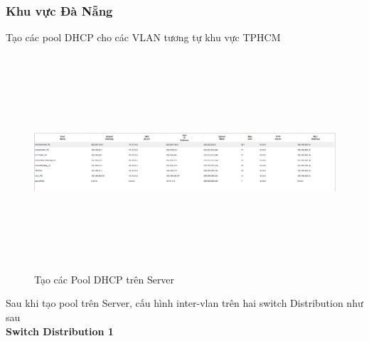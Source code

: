 \documentclass[12pt,a4paper]{report}
\begin{document}
\subsubsection{Khu vực Đà Nẵng}
\hspace*{0.25cm}Tạo các pool DHCP cho các VLAN tương tự khu vực TPHCM\\
\begin{figure}[H]
    \centering
    \includegraphics[width=16cm, height=8cm]{img/472.png}
    \caption{Tạo các Pool DHCP trên Server}
    \label{hinh472}
\end{figure}
\hspace*{0.25cm}Sau khi tạo pool trên Server, cấu hình inter-vlan trên hai switch Distribution như sau\\
\hspace*{1cm}\textbf{Switch Distribution 1}\\
\end{document}
